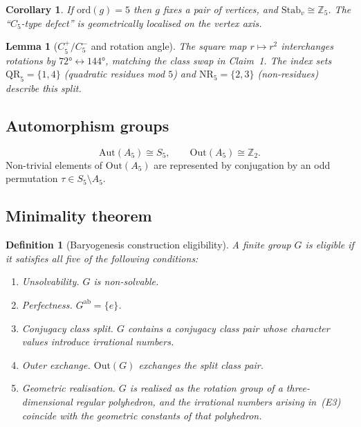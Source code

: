\documentclass[sn-mathphys-num,Numbered]{sn-jnl}
\theoremstyle{thmstyleone}
\newtheorem{lemma}[theorem]{Lemma}
\newtheorem{corollary}[theorem]{Corollary}
\theoremstyle{thmstylethree}
\newtheorem{definition}[theorem]{Definition}
\theoremstyle{thmstyletwo}
\begin{document}
\begin{corollary}
\label{cor:vertex-stab}
If $\mathrm{ord}(g) = 5$ then $g$ fixes a pair of vertices, and
$\mathrm{Stab}_v \cong \mathbb{Z}_5$. The ``$C_5$-type defect'' is
geometrically localised on the vertex axis.
\end{corollary}

\begin{lemma}[$C_5^+/C_5^-$ and rotation angle]
\label{lem:square-map}
The square map $r\mapsto r^2$ interchanges rotations by $72°
\leftrightarrow 144°$, matching the class swap in Claim~1.  The index
sets $\mathrm{QR}_5 = \{1,4\}$ (quadratic residues mod $5$) and
$\mathrm{NR}_5 = \{2,3\}$ (non-residues) describe this split.
\end{lemma}

\subsection{Automorphism groups}
\label{ssec:automorphisms}

\begin{equation}
  \mathrm{Aut}(A_5) \cong S_5, \qquad
  \mathrm{Out}(A_5) \cong \mathbb{Z}_2.
  \label{eq:out}
\end{equation}
Non-trivial elements of $\mathrm{Out}(A_5)$ are represented by
conjugation by an odd permutation $\tau \in S_5 \setminus A_5$.

\subsection{Minimality theorem}
\label{ssec:minimality}

\begin{definition}[Baryogenesis construction eligibility]
\label{def:eligible}
A finite group $G$ is \emph{eligible} if it satisfies all five of the
following conditions:
\begin{enumerate}
  \item[(E1)] \textit{Unsolvability.} $G$ is non-solvable.
  \item[(E2)] \textit{Perfectness.} $G^{\mathrm{ab}} = \{e\}$.
  \item[(E3)] \textit{Conjugacy class split.} $G$ contains a conjugacy
    class pair whose character values introduce irrational numbers.
  \item[(E4)] \textit{Outer exchange.} $\mathrm{Out}(G)$ exchanges the
    split class pair.
  \item[(E5)] \textit{Geometric realisation.} $G$ is realised as the
    rotation group of a three-dimensional regular polyhedron, and the
    irrational numbers arising in~(E3) coincide with the geometric
    constants of that polyhedron.
\end{enumerate}
\end{definition}
\end{document}
